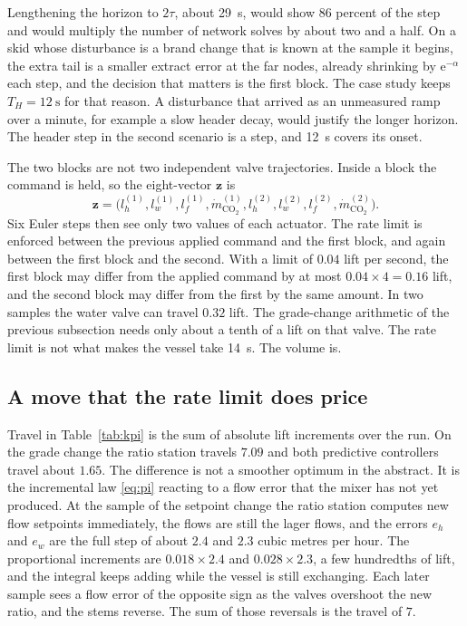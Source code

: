 Lengthening the horizon to $2\tau$, about \SI{29}{\second}, would show $86$ percent of the step and would multiply the number of network solves by about two and a half. On a skid whose disturbance is a brand change that is known at the sample it begins, the extra tail is a smaller extract error at the far nodes, already shrinking by $\mathrm{e}^{-\alpha}$ each step, and the decision that matters is the first block. The case study keeps $T_H=\SI{12}{\second}$ for that reason. A disturbance that arrived as an unmeasured ramp over a minute, for example a slow header decay, would justify the longer horizon. The header step in the second scenario is a step, and \SI{12}{\second} covers its onset.

The two blocks are not two independent valve trajectories. Inside a block the command is held, so the eight-vector $\mathbf{z}$ is
\begin{equation}
\mathbf{z}
=
\big(l_h^{(1)},l_w^{(1)},l_f^{(1)},\dot m_{\mathrm{CO_2}}^{(1)},
l_h^{(2)},l_w^{(2)},l_f^{(2)},\dot m_{\mathrm{CO_2}}^{(2)}\big).
\end{equation}
Six Euler steps then see only two values of each actuator. The rate limit is enforced between the previous applied command and the first block, and again between the first block and the second. With a limit of $0.04$ lift per second, the first block may differ from the applied command by at most $0.04\times 4=0.16$ lift, and the second block may differ from the first by the same amount. In two samples the water valve can travel $0.32$ lift. The grade-change arithmetic of the previous subsection needs only about a tenth of a lift on that valve. The rate limit is not what makes the vessel take \SI{14}{\second}. The volume is.

\subsection{A move that the rate limit does price}
\label{sec:travel}

Travel in Table~\ref{tab:kpi} is the sum of absolute lift increments over the run. On the grade change the ratio station travels $7.09$ and both predictive controllers travel about $1.65$. The difference is not a smoother optimum in the abstract. It is the incremental law \eqref{eq:pi} reacting to a flow error that the mixer has not yet produced. At the sample of the setpoint change the ratio station computes new flow setpoints immediately, the flows are still the lager flows, and the errors $e_h$ and $e_w$ are the full step of about $2.4$ and $2.3$ cubic metres per hour. The proportional increments are $0.018\times 2.4$ and $0.028\times 2.3$, a few hundredths of lift, and the integral keeps adding while the vessel is still exchanging. Each later sample sees a flow error of the opposite sign as the valves overshoot the new ratio, and the stems reverse. The sum of those reversals is the travel of $7$.

